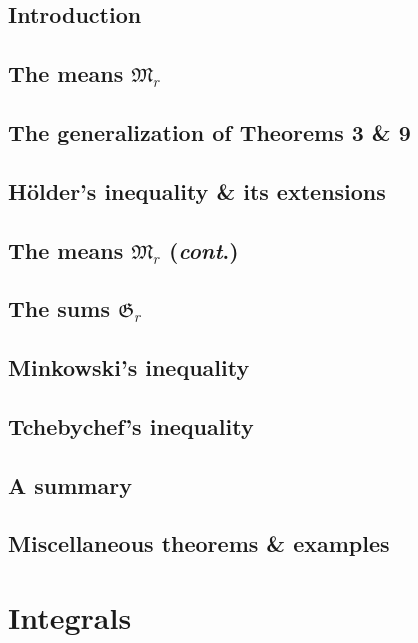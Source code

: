 \documentclass[oneside]{book}
\numberwithin{equation}{section}
\begin{document}
\subsection{Introduction}

\subsection{The means $\mathfrak{M}_r$}

\subsection{The generalization of Theorems 3 \& 9}

\subsection{H\"older's inequality \& its extensions}

\subsection{The means $\mathfrak{M}_r$ (\textit{cont}.)}

\subsection{The sums $\mathfrak{G}_r$}

\subsection{Minkowski's inequality}

\subsection{Tchebychef's inequality}

\subsection{A summary}

\subsection{Miscellaneous theorems \& examples}


\section{Integrals}
\end{document}
